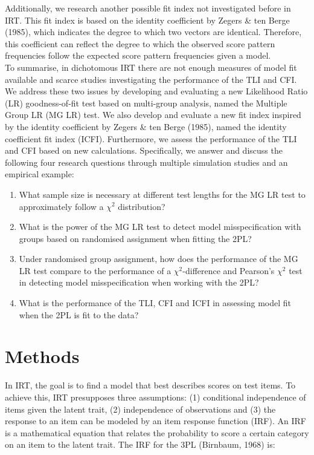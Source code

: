\documentclass[Royal,sageapa,times,doublespace]{sagej}
\begin{document}
\indent Additionally, we research another possible fit index not investigated before in IRT. This fit index is based on the identity coefficient by Zegers \& ten Berge (1985), which indicates the degree to which two vectors are identical. Therefore, this coefficient can reflect the degree to which the observed score pattern frequencies follow the expected score pattern frequencies given a model. \\
\indent To summarise, in dichotomous IRT there are not enough measures of model fit available and scarce studies investigating the performance of the TLI and CFI. We address these two issues by developing and evaluating a new Likelihood Ratio (LR) goodness-of-fit test based on multi-group analysis, named the Multiple Group LR (MG LR) test. We also develop and evaluate a new fit index inspired by the identity coefficient by Zegers \& ten Berge (1985), named the identity coefficient fit index (ICFI). Furthermore, we assess the performance of the TLI and CFI based on new calculations. Specifically, we answer and discuss the following four research questions through multiple simulation studies and an empirical example:
\begin{enumerate}
\item{What sample size is necessary at different test lengths for the MG LR test to approximately follow a $\chi^2$ distribution?}
\item{What is the power of the MG LR test to detect model misspecification with groups based on randomised assignment when fitting the 2PL?}
\item{Under randomised group assignment, how does the performance of the MG LR test compare to the performance of a $\chi^2$-difference and Pearson's $\chi^2$ test in detecting model misspecification when working with the 2PL?}
\item{What is the performance of the TLI, CFI and ICFI in assessing model fit when the 2PL is fit to the data?}
\end{enumerate}

\section{\centering Methods}
In IRT, the goal is to find a model that best describes scores on test items. To achieve this, IRT presupposes three assumptions: (1) conditional independence of items given the latent trait, (2) independence of observations and (3) the response to an item can be modeled by an item response function (IRF). An IRF is a mathematical equation that relates the probability to score a certain category on an item to the latent trait. The IRF for the 3PL (Birnbaum, 1968) is:
\end{document}
